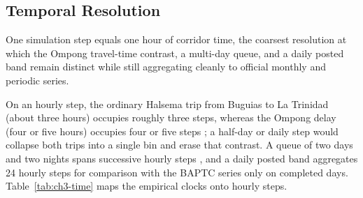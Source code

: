\documentclass{icsthesis}
\begin{document}
\begin{mainmatter}
		\subsection{Temporal Resolution}

			One simulation step equals one hour of corridor time, the coarsest resolution at which the Ompong travel-time contrast, a multi-day queue, and a daily posted band remain distinct while still aggregating cleanly to official monthly and periodic series.

			On an hourly step, the ordinary Halsema trip from Buguias to La Trinidad (about three hours) occupies roughly three steps, whereas the Ompong delay (four or five hours) occupies four or five steps \citep{PNA2018,Espiritu2018}; a half-day or daily step would collapse both trips into a single bin and erase that contrast. A queue of two days and two nights spans successive hourly steps \citep{AntonioDumlao2026}, and a daily posted band aggregates 24 hourly steps for comparison with the BAPTC series only on completed days. Table~\ref{tab:ch3-time} maps the empirical clocks onto hourly steps.


\end{mainmatter}
\end{document}
